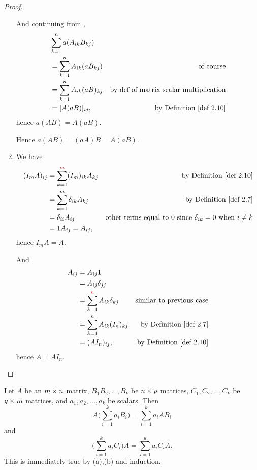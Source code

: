 \begin{proof}
\begin{enumerate}
And continuing from ,
\begin{align*}
    & \sum_{k = 1}^n a (A_{ik} B_{kj}) \\
    & = \sum_{k = 1}^n A_{ik} (a B_{kj}) & \text{of course} \\
    & = \sum_{k = 1}^n A_{ik} (a B)_{kj} & \text{by def of matrix scalar multiplication} \\
    & = [A(aB)]_{ij}, & \text{by \DEF{2.10}}
\end{align*}
hence \(a(AB) = A(aB)\).

Hence \(a(AB) = (aA)B = A(aB)\).

\item
We have
\begin{align*}
    (I_mA)_{ij} & = \sum_{k = 1}^{\RED{m}} (I_m)_{ik} A_{kj} & \text{by \DEF{2.10}} \\
                & = \sum_{k = 1}^m \delta_{ik} A_{kj} & \text{by \DEF{2.7}} \\
                & = \delta_{ii} A_{ij} & \text{other terms equal to \(0\) since \(\delta_{ik} = 0\) when \(i \ne k\)} \\
                & = 1 A_{ij} = A_{ij},
\end{align*}
hence \(I_mA = A\).

And
\begin{align*}
    A_{ij} & = A_{ij} 1 \\
           & = A_{ij} \delta_{jj} \\
           & = \sum_{k = 1}^{\RED{n}} A_{ik} \delta_{kj} & \text{similar to previous case} \\
           & = \sum_{k = 1}^n A_{ik} (I_n)_{kj} & \text{by \DEF{2.7}} \\
           & = (AI_n)_{ij}, & \text{by \DEF{2.10}}
\end{align*}
hence \(A = AI_n\).
\end{enumerate}
\end{proof}

\begin{corollary} \label{corollary 2.12.1}
Let \(A\) be an \(m \times n\) matrix, \(B_1 B_2, ..., B_k\) be \(n \times p\) matrices, \(C_1, C_2, ..., C_k\) be \(q \times m\) matrices, and \(a_1, a_2, ..., a_k\) be scalars.
Then
\[
    A\bigg( \sum_{i = 1}^k a_i B_i \bigg) = \sum_{i = 1}^k a_i A B_i
\]
and
\[
    \bigg( \sum_{i = 1}^k a_i C_i \bigg) A = \sum_{i = 1}^k a_i C_i A.
\]
This is immediately true by (a),(b) and induction.
\end{corollary}

